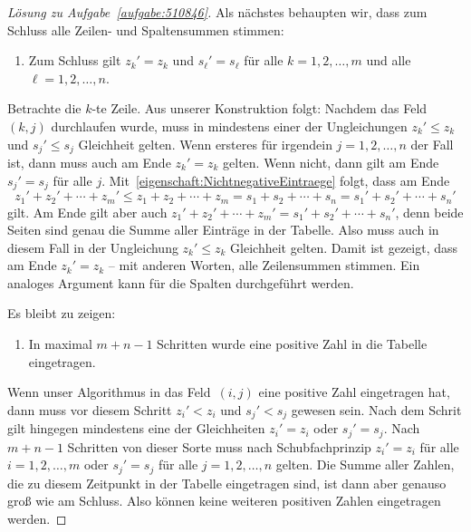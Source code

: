 \begin{proof}[Lösung zu Aufgabe~\ref{aufgabe:510846}]
	Als nächstes behaupten wir, dass zum Schluss alle Zeilen- und Spaltensummen stimmen:
	\begin{enumerate}[resume,label={$(\arabic*)$},ref={$(\arabic*)$}]\itshape
		\item Zum Schluss gilt $z_k'=z_k$ und $s_\ell'=s_\ell$ für alle $k=1,2,\dotsc,m$ und alle $\ell=1,2,\dotsc,n$.\label{eigenschaft:RichtigeZeilenSpaltenSummen}
	\end{enumerate}
	Betrachte die $k$-te Zeile. Aus unserer Konstruktion folgt: Nachdem das Feld~$(k,j)$ durchlaufen wurde, muss in mindestens einer der Ungleichungen $z_k'\leqslant z_k$ und $s_j'\leqslant s_j$ Gleichheit gelten. Wenn ersteres für irgendein $j=1,2,\dotsc,n$ der Fall ist, dann muss auch am Ende $z_k'=z_k$ gelten. Wenn nicht, dann gilt am Ende $s_j'=s_j$ für alle $j$. Mit~\ref{eigenschaft:NichtnegativeEintraege} folgt, dass am Ende 
	\begin{equation*}
		z_1'+z_2'+\dotsb+z_m'\leqslant z_1+z_2+\dotsb+z_m=s_1+s_2+\dotsb+s_n=s_1'+s_2'+\dotsb+s_n'
	\end{equation*}
	gilt. Am Ende gilt aber auch $z_1'+z_2'+\dotsb+z_m'=s_1'+s_2'+\dotsb+s_n'$, denn beide Seiten sind genau die Summe aller Einträge in der Tabelle. Also muss auch in diesem Fall in der Ungleichung $z_k'\leqslant z_k$ Gleichheit gelten. Damit ist gezeigt, dass am Ende $z_k'=z_k$ -- mit anderen Worten, alle Zeilensummen stimmen. Ein analoges Argument kann für die Spalten durchgeführt werden.
	
	Es bleibt zu zeigen:
	\begin{enumerate}[resume,label={$(\arabic*)$},ref={$(\arabic*)$}]\itshape
		\item In maximal $m+n-1$ Schritten wurde eine positive Zahl in die Tabelle eingetragen.\label{eigenschaft:PositiveEintraege}
	\end{enumerate}
	Wenn unser Algorithmus in das Feld~$(i,j)$ eine positive Zahl eingetragen hat, dann muss vor diesem Schritt $z_i'<z_i$ und $s_j'<s_j$ gewesen sein. Nach dem Schrit gilt hingegen mindestens eine der Gleichheiten $z_i'=z_i$ oder $s_j'=s_j$. Nach $m+n-1$ Schritten von dieser Sorte muss nach Schubfachprinzip $z_i'=z_i$ für alle $i=1,2,\dotsc,m$ oder $s_j'=s_j$ für alle $j=1,2,\dotsc,n$ gelten. Die Summe aller Zahlen, die zu diesem Zeitpunkt in der Tabelle eingetragen sind, ist dann aber genauso groß wie am Schluss. Also können keine weiteren positiven Zahlen eingetragen werden.
\end{proof}

